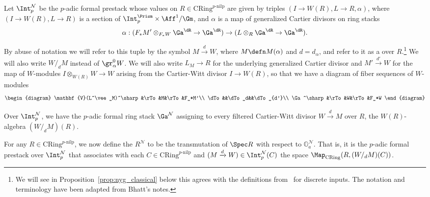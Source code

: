 \documentclass[10pt]{amsart}
\begin{document}
\begin{definition}
\label{defn:ZpN}
Let $\Int_p^{\mathcal{N}}$ be the $p$-adic formal prestack whose values on $R\in \mathrm{CRing}^{p\text{-nilp}}$ are given by triples $(I\to W(R),L\to R,\alpha)$, where $(I\to W(R),L\to R)$ is a section of $\Int_p^\Prism\times \Aff^1/\Gm$, and $\alpha$ is a map of generalized Cartier divisors on ring stacks
\[
\alpha:(F_*M'\otimes_{F_*W}\Ga^{\dR}\to \Ga^{\dR})\to (L\otimes_R\Ga^{\dR}\to \Ga^{\dR}).
\]

By abuse of notation we will refer to this tuple by the symbol $M\xrightarrow{d} W$, where $M \defn M(\alpha)$ and $d = d_\alpha$, and refer to it as a  over $R$.\footnote{We will see in Proposition~\ref{prop:nyg_classical} below this agrees with the definitions from~\cite{bhatt_lectures} for discrete inputs. The notation and terminology have been adapted from Bhatt's notes.} We will also write $W/_dM$ instead of $\gr^0_\alpha W$. We will also write $L_M\to R$ for the underlying generalized Cartier divisor and $M'\xrightarrow{d'} W$ for the map of $W$-modules $I\otimes_{W(R)}W\to W$ arising from the Cartier-Witt divisor $I\to W(R)$, so that we have a diagram of fiber sequences of $W$-modules
\[
\begin{diagram}
\mathbf{V}(L^\vee_M)^\sharp&\rTo&M&\rTo&F_*M'\\
\dTo&&\dTo_d&&\dTo_{d'}\\
\Ga^\sharp&\rTo&W&\rTo&F_*W
\end{diagram}
\]
\end{definition}

\begin{definition}
Over $\Int_p^{\mathcal{N}}$, we have the $p$-adic formal ring stack $\Ga^{\mathcal{N}}$ assigning to every filtered Cartier-Witt divisor $W\xrightarrow{d}M$ over $R$, the $W(R)$-algebra $(W/_dM)(R)$. 

For any $R\in\mathrm{CRing}^{p\text{-nilp}}$, we now define the  $R^\mathcal{N}$ to be the transmutation of $\Spec R$ with respect to  $\mathbb{G}_a^{\mathcal{N}}$. That is, it is the $p$-adic formal prestack over $\Int_p^{\mathcal{N}}$ that associates with each $C\in \mathrm{CRing}^{p\text{-nilp}}$ and $(M\xrightarrow{d}W)\in\Int_p^{\mathcal{N}}(C)$ the space $\Map_{\mathrm{CRing}}(R,(W/_dM)(C))$.
\end{definition}     
\end{document}
